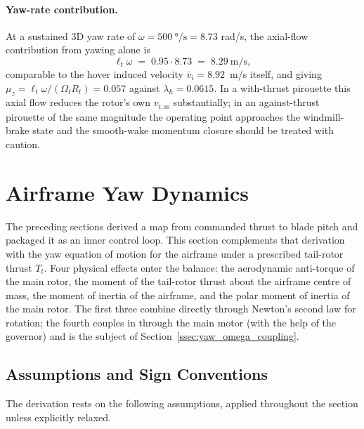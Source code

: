 \documentclass[11pt,a4paper]{article}
\newcommand{\OmegaT}{\Omega_t}
\newcommand{\Rt}{R_t}
\newcommand{\Tt}{T_t}
\newcommand{\viss}{v_{i,\text{ss}}}
\newcommand{\bvi}{\bar{v}_i}
\let\oldsection\section
\renewcommand{\section}{\clearpage\oldsection}
\begin{document}
\paragraph{Yaw-rate contribution.}
At a sustained 3D yaw rate of \(\omega=\SI{500}{\degree\per\second}=8.73\)
rad/s, the axial-flow contribution from yawing alone is
\begin{equation*}
\ell_t\omega \;=\; 0.95\cdot 8.73 \;=\; 8.29~\text{m/s},
\end{equation*}
comparable to the hover induced velocity \(\bvi=8.92\)~m/s
itself, and giving \(\mu_z=\ell_t\omega/(\OmegaT\Rt)=0.057\) against
\(\lambda_h=0.0615\). In a with-thrust pirouette this axial flow
reduces the rotor's own \(\viss\) substantially; in an against-thrust
pirouette of the same magnitude the operating point approaches the
windmill-brake state and the smooth-wake momentum closure should be
treated with caution.

\section{Airframe Yaw Dynamics}\label{sec:yaw}

The preceding sections derived a map from commanded thrust to blade
pitch and packaged it as an inner control loop. This section
complements that derivation with the yaw equation of motion for the
airframe under a prescribed tail-rotor thrust
\(\Tt\). Four physical effects enter the balance: the aerodynamic
anti-torque of the main rotor, the moment of the tail-rotor thrust
about the airframe centre of mass, the moment of inertia of the
airframe, and the polar moment of inertia of the main rotor. The
first three combine directly through Newton's second law for
rotation; the fourth couples in through the main motor (with
the help of the governor) and is the subject of
Section~\ref{ssec:yaw_omega_coupling}.

\subsection{Assumptions and Sign Conventions}\label{ssec:yaw_assumptions}

The derivation rests on the following assumptions, applied
throughout the section unless explicitly relaxed.
\end{document}
